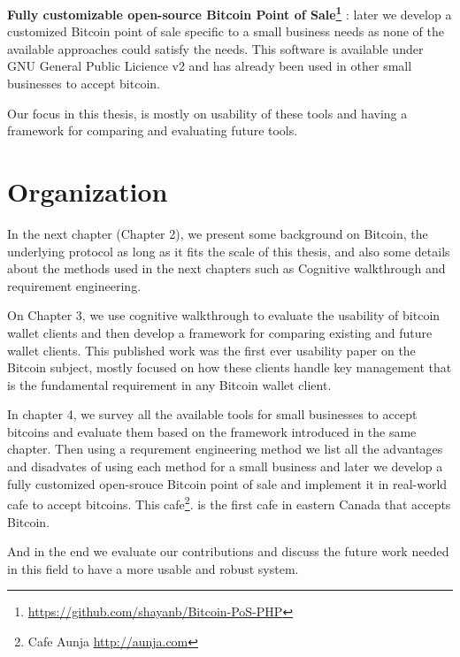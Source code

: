 \textbf{Fully customizable open-source Bitcoin Point of Sale\footnote{\url{https://github.com/shayanb/Bitcoin-PoS-PHP}} }: later we develop a customized Bitcoin point of sale specific to a small business needs as none of the available approaches could satisfy the needs. This software is available under GNU General Public Licience v2 and has already been used in other small businesses to accept bitcoin.

Our focus in this thesis, is mostly on usability of these tools and having a framework for comparing and evaluating future tools.

\section{Organization}
In the next chapter (Chapter 2), we present some background on Bitcoin, the underlying protocol as long as it fits the scale of this thesis, and also some details about the methods used in the next chapters such as Cognitive walkthrough and requirement engineering.

On Chapter 3, we use cognitive walkthrough to evaluate the usability of bitcoin wallet clients and then develop a framework for comparing existing and future wallet clients. This published work was the first ever usability paper on the Bitcoin subject, mostly focused on how these clients handle key management that is the fundamental requirement in any Bitcoin wallet client.

In chapter 4, we survey all the available tools for small businesses to accept bitcoins and evaluate them based on the framework introduced in the same chapter. Then using a requrement engineering method we list all the advantages and disadvates of using each method for a small business and later we develop a fully customized open-srouce Bitcoin point of sale and implement it in real-world cafe to accept bitcoins. This cafe\footnote{ Cafe Aunja \url{http://aunja.com}}. is the first cafe in eastern Canada that accepts Bitcoin.

And in the end we evaluate our contributions and discuss the future work needed in this field to have a more usable and robust system.